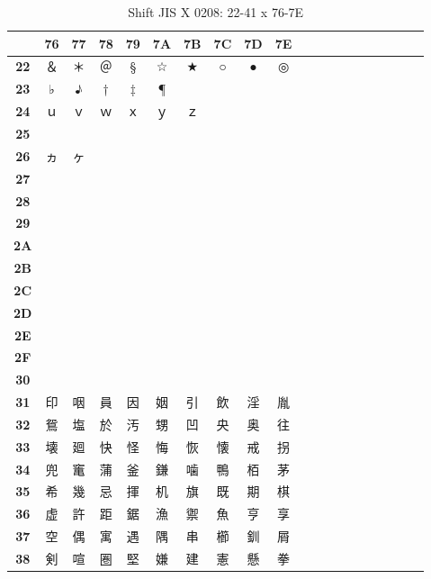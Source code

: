 \begin{table}[H]
\Fontified
\centering
\caption{Shift JIS X 0208: 22-41 x 76-7E}
\begin{tabular}{|Sc|Sc|Sc|Sc|Sc|Sc|Sc|Sc|Sc|Sc|}
\hline
 & \textbf{76} & \textbf{77} & \textbf{78} & \textbf{79} & \textbf{7A} & \textbf{7B} & \textbf{7C} & \textbf{7D} & \textbf{7E} \\ \hline
\textbf{22} & ＆ & ＊ & ＠ & § & ☆ & ★ & ○ & ● & ◎ \\ \hline
\textbf{23} & ♭ & ♪ & † & ‡ & ¶ &  &  &  &  \\ \hline
\textbf{24} & ｕ & ｖ & ｗ & ｘ & ｙ & ｚ &  &  &  \\ \hline
\textbf{25} &  &  &  &  &  &  &  &  &  \\ \hline
\textbf{26} & ヵ & ヶ &  &  &  &  &  &  &  \\ \hline
\textbf{27} &  &  &  &  &  &  &  &  &  \\ \hline
\textbf{28} &  &  &  &  &  &  &  &  &  \\ \hline
\textbf{29} &  &  &  &  &  &  &  &  &  \\ \hline
\textbf{2A} &  &  &  &  &  &  &  &  &  \\ \hline
\textbf{2B} &  &  &  &  &  &  &  &  &  \\ \hline
\textbf{2C} &  &  &  &  &  &  &  &  &  \\ \hline
\textbf{2D} &  &  &  &  &  &  &  &  &  \\ \hline
\textbf{2E} &  &  &  &  &  &  &  &  &  \\ \hline
\textbf{2F} &  &  &  &  &  &  &  &  &  \\ \hline
\textbf{30} &  &  &  &  &  &  &  &  &  \\ \hline
\textbf{31} & 印 & 咽 & 員 & 因 & 姻 & 引 & 飲 & 淫 & 胤 \\ \hline
\textbf{32} & 鴛 & 塩 & 於 & 汚 & 甥 & 凹 & 央 & 奥 & 往 \\ \hline
\textbf{33} & 壊 & 廻 & 快 & 怪 & 悔 & 恢 & 懐 & 戒 & 拐 \\ \hline
\textbf{34} & 兜 & 竃 & 蒲 & 釜 & 鎌 & 噛 & 鴨 & 栢 & 茅 \\ \hline
\textbf{35} & 希 & 幾 & 忌 & 揮 & 机 & 旗 & 既 & 期 & 棋 \\ \hline
\textbf{36} & 虚 & 許 & 距 & 鋸 & 漁 & 禦 & 魚 & 亨 & 享 \\ \hline
\textbf{37} & 空 & 偶 & 寓 & 遇 & 隅 & 串 & 櫛 & 釧 & 屑 \\ \hline
\textbf{38} & 剣 & 喧 & 圏 & 堅 & 嫌 & 建 & 憲 & 懸 & 拳 \\ \hline

\end{tabular}
\end{table}
